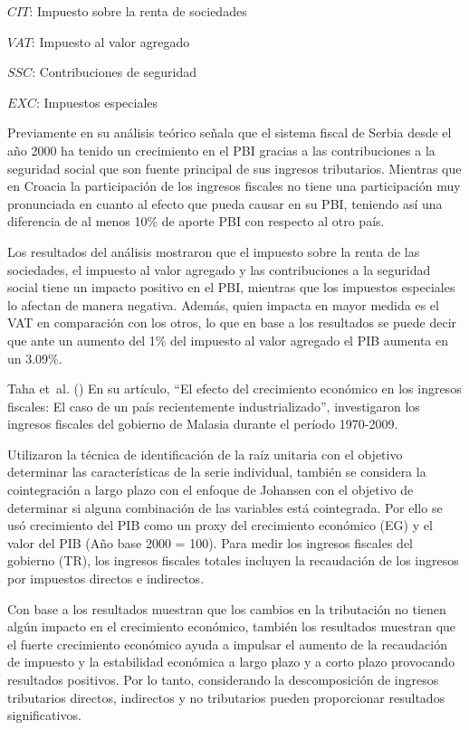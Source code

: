\documentclass[
  jou,
  floatsintext,
  longtable,
  a4paper,
  nolmodern,
  notxfonts,
  notimes,
  12pt,
  colorlinks=true,linkcolor=blue,citecolor=blue,urlcolor=blue]{apa7}
\begin{document}
\(CIT\): Impuesto sobre la renta de sociedades

\(VAT\): Impuesto al valor agregado

\(SSC\): Contribuciones de seguridad

\(EXC\): Impuestos especiales

Previamente en su análisis teórico señala que el sistema fiscal de
Serbia desde el año 2000 ha tenido un crecimiento en el PBI gracias a
las contribuciones a la seguridad social que son fuente principal de sus
ingresos tributarios. Mientras que en Croacia la participación de los
ingresos fiscales no tiene una participación muy pronunciada en cuanto
al efecto que pueda causar en su PBI, teniendo así una diferencia de al
menos 10\% de aporte PBI con respecto al otro país.

Los resultados del análisis mostraron que el impuesto sobre la renta de
las sociedades, el impuesto al valor agregado y las contribuciones a la
seguridad social tiene un impacto positivo en el PBI, mientras que los
impuestos especiales lo afectan de manera negativa. Además, quien
impacta en mayor medida es el VAT en comparación con los otros, lo que
en base a los resultados se puede decir que ante un aumento del 1\% del
impuesto al valor agregado el PIB aumenta en un 3.09\%.

Taha et~al. () En su artículo, ``El
efecto del crecimiento económico en los ingresos fiscales: El caso de un
país recientemente industrializado'', investigaron los ingresos fiscales
del gobierno de Malasia durante el período 1970-2009.

Utilizaron la técnica de identificación de la raíz unitaria con el
objetivo determinar las características de la serie individual, también
se considera la cointegración a largo plazo con el enfoque de Johansen
con el objetivo de determinar si alguna combinación de las variables
está cointegrada. Por ello se usó crecimiento del PIB como un proxy del
crecimiento económico (EG) y el valor del PIB (Año base 2000 = 100).
Para medir los ingresos fiscales del gobierno (TR), los ingresos
fiscales totales incluyen la recaudación de los ingresos por impuestos
directos e indirectos.

Con base a los resultados muestran que los cambios en la tributación no
tienen algún impacto en el crecimiento económico, también los resultados
muestran que el fuerte crecimiento económico ayuda a impulsar el aumento
de la recaudación de impuesto y la estabilidad económica a largo plazo y
a corto plazo provocando resultados positivos. Por lo tanto,
considerando la descomposición de ingresos tributarios directos,
indirectos y no tributarios pueden proporcionar resultados
significativos.
\end{document}
